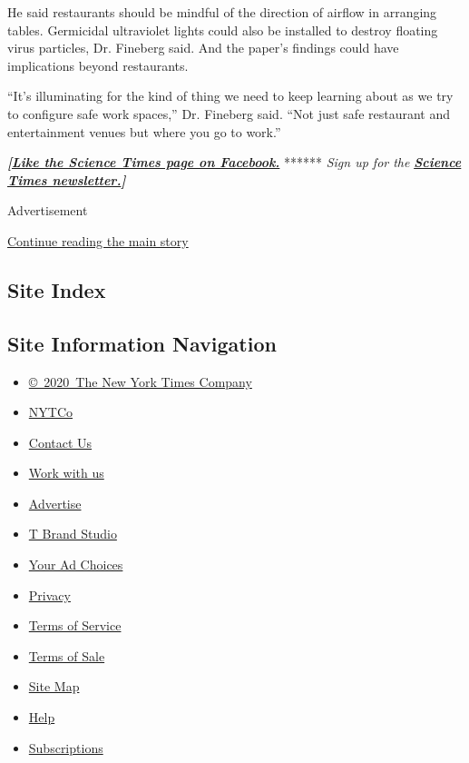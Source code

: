 He said restaurants should be mindful of the direction of airflow in
arranging tables. Germicidal ultraviolet lights could also be installed
to destroy floating virus particles, Dr. Fineberg said. And the paper's
findings could have implications beyond restaurants.

``It's illuminating for the kind of thing we need to keep learning about
as we try to configure safe work spaces,'' Dr. Fineberg said. ``Not just
safe restaurant and entertainment venues but where you go to work.''

\textbf{\emph{{[}}\href{http://on.fb.me/1paTQ1h}{\emph{Like the Science
Times page on Facebook.}}} ****** \emph{\textbar{} Sign up for the}
\textbf{\href{http://nyti.ms/1MbHaRU}{\emph{Science Times
newsletter.}}\emph{{]}}}

Advertisement

\protect\hyperlink{after-bottom}{Continue reading the main story}

\hypertarget{site-index}{%
\subsection{Site Index}\label{site-index}}

\hypertarget{site-information-navigation}{%
\subsection{Site Information
Navigation}\label{site-information-navigation}}

\begin{itemize}
\tightlist
\item
  \href{https://help.nytimes.com/hc/en-us/articles/115014792127-Copyright-notice}{©~2020~The
  New York Times Company}
\end{itemize}

\begin{itemize}
\tightlist
\item
  \href{https://www.nytco.com/}{NYTCo}
\item
  \href{https://help.nytimes.com/hc/en-us/articles/115015385887-Contact-Us}{Contact
  Us}
\item
  \href{https://www.nytco.com/careers/}{Work with us}
\item
  \href{https://nytmediakit.com/}{Advertise}
\item
  \href{http://www.tbrandstudio.com/}{T Brand Studio}
\item
  \href{https://www.nytimes.com/privacy/cookie-policy\#how-do-i-manage-trackers}{Your
  Ad Choices}
\item
  \href{https://www.nytimes.com/privacy}{Privacy}
\item
  \href{https://help.nytimes.com/hc/en-us/articles/115014893428-Terms-of-service}{Terms
  of Service}
\item
  \href{https://help.nytimes.com/hc/en-us/articles/115014893968-Terms-of-sale}{Terms
  of Sale}
\item
  \href{https://spiderbites.nytimes.com}{Site Map}
\item
  \href{https://help.nytimes.com/hc/en-us}{Help}
\item
  \href{https://www.nytimes.com/subscription?campaignId=37WXW}{Subscriptions}
\end{itemize}
